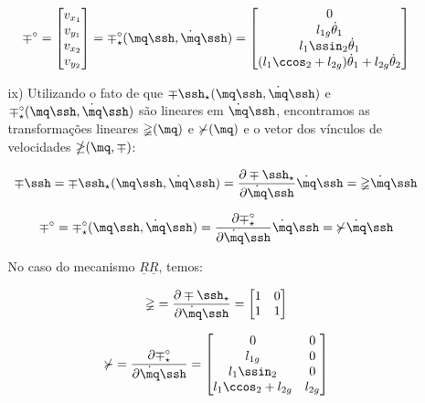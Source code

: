 \begin{itemize}
\begin{itemize}
	\begin{equation}
	\mp^\circ = 
	\begin{bmatrix}
	v_{x_1} \\
	v_{y_1} \\
	v_{x_2} \\
	v_{y_2} \\
	\end{bmatrix}
	= \mp^\circ_ \star (\mq\ssh, \dot{\mq}\ssh ) =
	\begin{bmatrix}
	0 \\
	l_{1g} \dot{\theta}_1 \\
	l_1 \ssin_2 \dot{\theta}_1\\
	(l_1 \ccos_2 + l_{2g} )\dot{\theta}_1 + l_{2g} \dot{\theta}_2 \\
	\end{bmatrix}
	\end{equation}
	
	\item[ix)] Utilizando o fato de que $\mp\ssh_\star (\mq\ssh, \dot{\mq}\ssh )$ e $\mp^\circ_ \star (\mq\ssh, \dot{\mq}\ssh )$ s\~ao lineares em $\dot{\mq}\ssh$, encontramos as transforma\c{c}\~oes lineares $\mathbb{\Psi}(\mq)$ e $\mathbb{\Upsilon}(\mq)$ e o vetor dos v\'inculos de velocidades $\mathbb{\Lambda}(\mq,\mp)$:
	
	\begin{equation}
	\mp\ssh = \mp\ssh_\star (\mq\ssh, \dot{\mq}\ssh ) = \frac{\partial \mp\ssh_\star}{\partial \dot{\mq}\ssh} \dot{\mq}\ssh = \mathbb{\Psi} \dot{\mq}\ssh
	\end{equation}
	
	\begin{equation}
	\mp^\circ = \mp^\circ_\star (\mq\ssh, \dot{\mq}\ssh ) = \frac{\partial \mp^\circ_\star}{\partial \dot{\mq}\ssh} \dot{\mq}\ssh = \mathbb{\Upsilon} \dot{\mq}\ssh
	\end{equation}

	No caso do mecanismo $\underline{R}\underline{R}$, temos:
	
	\begin{equation}
	\mathbb{\Psi} = \frac{\partial \mp\ssh_\star}{\partial \dot{\mq}\ssh} =
	\begin{bmatrix}
	1 & 0  \\
	1 & 1  \\
	\end{bmatrix}
	\end{equation}
	
	\begin{equation}
	\mathbb{\Upsilon} = \frac{\partial \mp^\circ_\star}{\partial \dot{\mq}\ssh} =
	\begin{bmatrix}
	0 & 0 \\
	l_{1g} & 0 \\
	l_1 \ssin_2 & 0 \\
	l_1 \ccos_2 + l_{2g} & l_{2g} 
	\end{bmatrix}
	\end{equation}\\


\end{itemize}
\end{itemize}
